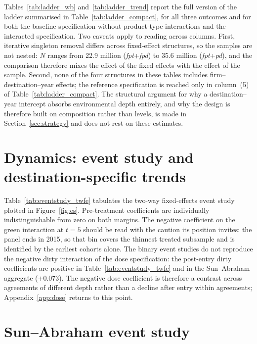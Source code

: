 \documentclass[12pt]{article}
\begin{document}
Tables~\ref{tab:ladder_wb} and~\ref{tab:ladder_trend} report the full version of the ladder summarised
in Table~\ref{tab:ladder_compact}, for all three outcomes and for both the baseline specification
without product-type interactions and the interacted specification. Two caveats apply to reading
across columns. First, iterative singleton removal differs across fixed-effect structures, so the
samples are not nested: $N$ ranges from 22.9 million (\textit{fpt}+\textit{fpd}) to 35.6 million
(\textit{fpt}+\textit{pd}), and the comparison therefore mixes the effect of the fixed effects with
the effect of the sample. Second, none of the four structures in these tables includes
firm--destination--year effects; the reference specification is reached only in column~(5) of
Table~\ref{tab:ladder_compact}. The structural argument for why a destination--year intercept absorbs
environmental depth entirely, and why the design is therefore built on composition rather than levels,
is made in Section~\ref{sec:strategy} and does not rest on these estimates.





\section{Dynamics: event study and destination-specific trends}\label{app:dynamics}

Table~\ref{tab:eventstudy_twfe} tabulates the two-way fixed-effects event study plotted in
Figure~\ref{fig:es}. Pre-treatment coefficients are individually indistinguishable from zero on both
margins. The negative coefficient on the green interaction at $t = 5$ should be read with the caution
its position invites: the panel ends in 2015, so that bin covers the thinnest treated subsample and is
identified by the earliest cohorts alone. The binary event studies do not reproduce the negative dirty interaction of the dose specification: the post-entry dirty coefficients are positive in Table~\ref{tab:eventstudy_twfe} and in the Sun--Abraham aggregate ($+0.073$). The negative dose coefficient is therefore a contrast across agreements of different depth rather than a decline after entry within agreements; Appendix~\ref{app:dose} returns to this point.



\section{Sun--Abraham event study}\label{app:sunab}
\end{document}
